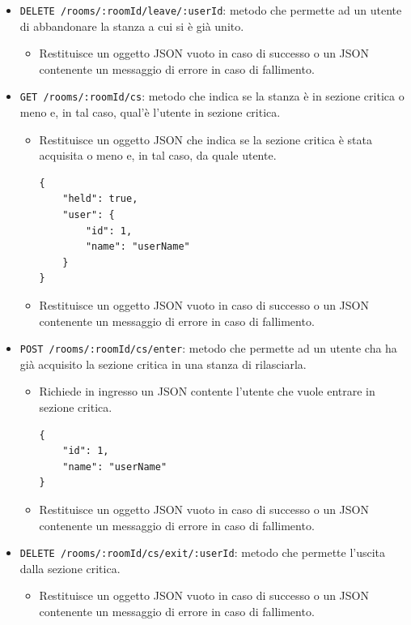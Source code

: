 \documentclass[a4paper]{article}
\begin{document}
\begin{itemize}
\begin{itemize}
\begin{verbatim}
        ...
    ]
}
        \end{verbatim}
    \end{itemize}
    \item \texttt{DELETE /rooms/:roomId/leave/:userId}: metodo che permette ad un utente di abbandonare la stanza a cui si è già unito.
       \begin{itemize}
    	\item Restituisce un oggetto JSON vuoto in caso di successo o un JSON contenente un messaggio di errore in caso di fallimento.
	    \end{itemize}
    \item \texttt{GET /rooms/:roomId/cs}: metodo che indica se la stanza è in sezione critica o meno e, in tal caso, qual'è l'utente in sezione critica.
    \begin{itemize}
        \item Restituisce un oggetto JSON che indica se la sezione critica è stata acquisita o meno e, in tal caso, da quale utente.
        \begin{verbatim}
{
    "held": true,
    "user": {
        "id": 1,
        "name": "userName"
    }
}
        \end{verbatim}
        \item Restituisce un oggetto JSON vuoto in caso di successo o un JSON contenente un messaggio di errore in caso di fallimento.
    \end{itemize}
    \item \texttt{POST /rooms/:roomId/cs/enter}: metodo che permette ad un utente cha ha già acquisito la sezione critica in una stanza di rilasciarla.
    \begin{itemize}
        \item Richiede in ingresso un JSON contente l'utente che vuole entrare in sezione critica.
        \begin{verbatim}
{
    "id": 1,
    "name": "userName"
}
        \end{verbatim}
        \item Restituisce un oggetto JSON vuoto in caso di successo o un JSON contenente un messaggio di errore in caso di fallimento.
    \end{itemize}
    \item \texttt{DELETE /rooms/:roomId/cs/exit/:userId}: metodo che permette l'uscita dalla sezione critica.
    \begin{itemize}
        \item Restituisce un oggetto JSON vuoto in caso di successo o un JSON contenente un messaggio di errore in caso di fallimento.
    \end{itemize}
\end{itemize}
\end{document}
